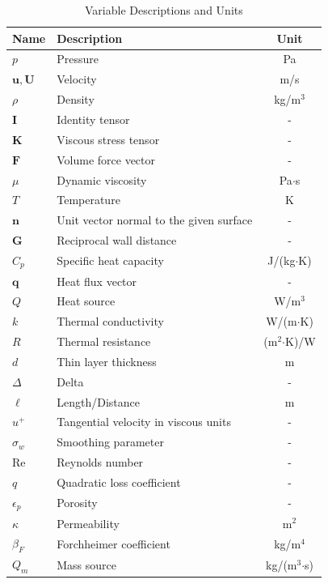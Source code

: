 \documentclass{report}
\begin{document}
    \begin{table}[h]
    \centering
    \begin{tabularx}{\textwidth}{ABC}
    \toprule
    \textbf{Name} & \textbf{Description} & \textbf{Unit} \\ 
    \midrule
    \( p \) & Pressure & Pa \\ 
    \( \mathbf{u}, \mathbf{U} \) & Velocity & m/s \\ 
    \( \rho \) & Density & kg/m$^3$ \\ 
    \( \mathbf{I} \) & Identity tensor & - \\ 
    \( \mathbf{K} \) & Viscous stress tensor & - \\ 
    \( \mathbf{F} \) & Volume force vector & - \\ 
    \( \mu \) & Dynamic viscosity & Pa$\cdot$s \\ 
    \( T \) & Temperature & K \\ 
    \( \mathbf{n} \) & Unit vector normal to the given surface & - \\ 
    \( \mathbf{G} \) & Reciprocal wall distance & - \\ 
    \( C_p \) & Specific heat capacity & J/(kg$\cdot$K) \\ 
    \( \mathbf{q} \) & Heat flux vector & - \\ 
    \( Q \) & Heat source & W/m$^3$ \\ 
    \( k \) & Thermal conductivity & W/(m$\cdot$K) \\ 
    \( R \) & Thermal resistance & (m$^2$$\cdot$K)/W \\ 
    \( d \) & Thin layer thickness & m \\ 
    \( \Delta \) & Delta & - \\ 
    \( \ell \) & Length/Distance & m \\ 
    \( u^+ \) & Tangential velocity in viscous units & - \\ 
    \( \sigma_w \) & Smoothing parameter & - \\ 
    Re & Reynolds number & - \\ 
    \( q \) & Quadratic loss coefficient & - \\ 
    \( \epsilon_p \) & Porosity & - \\ 
    \( \kappa \) & Permeability & m$^2$ \\ 
    \( \beta_F \) & Forchheimer coefficient & kg/m$^4$ \\ 
    \( Q_m \) & Mass source & kg/(m$^3$$\cdot$s) \\ 
    \bottomrule
    \end{tabularx}
    \caption{Variable Descriptions and Units}
    \label{tab:variables}
    \end{table}
\end{document}
